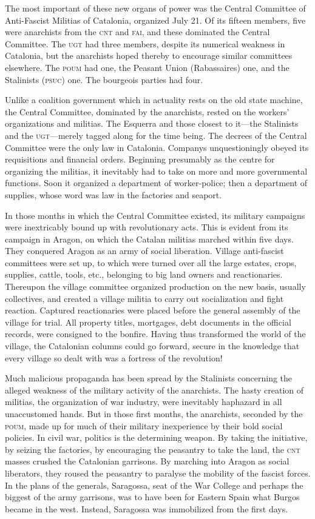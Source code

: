 The most important of these new organs of power was the Central Committee of Anti-Fascist Militias of Catalonia, organized July 21. Of its fifteen members, five were anarchists from the \textsc{cnt} and \textsc{fai}, and these dominated the Central Committee. The \textsc{ugt} had three members, despite its numerical weakness in Catalonia, but the anarchists hoped thereby to encourage similar committees elsewhere. The \textsc{poum} had one, the Peasant Union (Rabassaires) one, and the Stalinists (\textsc{psuc}) one. The bourgeois parties had four.

Unlike a coalition government which in actuality rests on the old state machine, the Central Committee, dominated by the anarchists, rested on the workers’ organizations and militias. The Esquerra and those closest to it---the Stalinists and the \textsc{ugt}---merely tagged along for the time being. The decrees of the Central Committee were the only law in Catalonia. Companys unquestioningly obeyed its requisitions and financial orders. Beginning presumably as the centre for organizing the militias, it inevitably had to take on more and more governmental functions. Soon it organized a department of worker-police; then a department of supplies, whose word was law in the factories and seaport.

In those months in which the Central Committee existed, its military campaigns were inextricably bound up with revolutionary acts. This is evident from its campaign in Aragon, on which the Catalan militias marched within five days. They conquered Aragon as an army of social liberation. Village anti-fascist committees were set up, to which were turned over all the large estates, crops, supplies, cattle, tools, etc., belonging to big land owners and reactionaries. Thereupon the village committee organized production on the new basis, usually collectives, and created a village militia to carry out socialization and fight reaction. Captured reactionaries were placed before the general assembly of the village for trial. All property titles, mortgages, debt documents in the official records, were consigned to the bonfire. Having thus transformed the world of the village, the Catalonian columns could go forward, secure in the knowledge that every village so dealt with was a fortress of the revolution!

Much malicious propaganda has been spread by the Stalinists concerning the alleged weakness of the military activity of the anarchists. The hasty creation of militias, the organization of war industry, were inevitably haphazard in all unaccustomed hands. But in those first months, the anarchists, seconded by the \textsc{poum}, made up for much of their military inexperience by their bold social policies. In civil war, politics is the determining weapon. By taking the initiative, by seizing the factories, by encouraging the peasantry to take the land, the \textsc{cnt} masses crushed the Catalonian garrisons. By marching into Aragon as social liberators, they roused the peasantry to paralyse the mobility of the fascist forces. In the plans of the generals, Saragossa, seat of the War College and perhaps the biggest of the army garrisons, was to have been for Eastern Spain what Burgos became in the west. Instead, Saragossa was immobilized from the first days.

